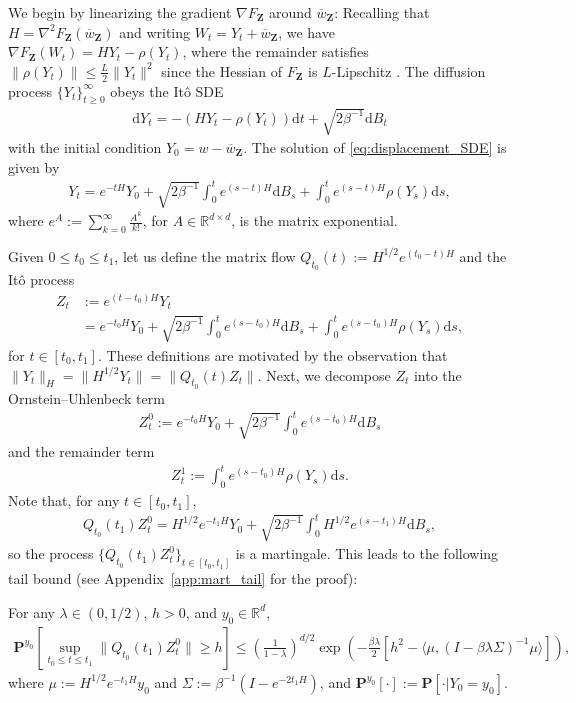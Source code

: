 \documentclass[final,12pt]{colt2018}
\numberwithin{equation}{section}
\numberwithin{equation}{section}
\def\PP{\mathbf{P}}
\def\Reals{\mathbb{R}}
\def\deq{:=}
\def\bd#1{\mathbf{#1}}
\def\bZ{\bd{Z}}
\def\barw{\overline{w}}
\def\d{{\mathrm d}}
\def\ave#1{\langle #1 \rangle}
\begin{document}
We begin by linearizing the gradient $\nabla F_\bZ$ around $\barw_\bZ$: Recalling that $H = \nabla^2 F_\bZ(\barw_\bZ)$ and writing $W_t = Y_t + \barw_\bZ$, we have $\nabla F_\bZ(W_t) = HY_t - \rho(Y_t)$, where the remainder satisfies $\|\rho(Y_t)\| \le \frac{L}{2}\|Y_t\|^2$ since the Hessian of $F_\bZ$ is $L$-Lipschitz \citep[Lemma~1.2.4]{nesterov2013introductory}.  The diffusion process $\{Y_t\}^\infty_{t \ge 0}$ obeys the It\^{o} SDE
    \begin{align}\label{eq:displacement_SDE}
    	\d Y_t = -(HY_t - \rho(Y_t))\d t + \sqrt{2\beta^{-1}}\d B_t
    \end{align}
    with the initial condition $Y_0 = w - \barw_\bZ$. The solution of \eqref{eq:displacement_SDE} is given by
    \begin{align*}
    	Y_t = e^{-tH}Y_0 + \sqrt{2\beta^{-1}}\int^t_0 e^{(s-t)H}\d B_s + \int^t_0 e^{(s-t)H}\rho(Y_s) \d s,
    \end{align*}
	where $e^{A} \deq \sum^\infty_{k=0} \frac{A^k}{k!}$, for $A \in \Reals^{d \times d}$, is the matrix exponential. 

Given  $0 \le t_0 \le t_1$, let us define the matrix flow $Q_{t_0}(t) \deq H^{1/2}e^{(t_0-t)H}$ and the It\^{o} process
		\begin{align*}
			Z_t &\deq e^{(t-t_0)H}Y_t \\
			&= e^{-t_0H}Y_0 + \sqrt{2\beta^{-1}}\int^t_0 e^{(s-t_0)H}\d B_s + \int^t_0 e^{(s-t_0)H}\rho(Y_s)\d s,
		\end{align*}
	for $t \in [t_0,t_1]$. These definitions are motivated by the observation that $\| Y_t \|_H = \| H^{1/2}Y_t \| = \|Q_{t_0}(t)Z_t \|$. Next, we decompose $Z_t$ into the Ornstein--Uhlenbeck term
	    \begin{align*}
	    	Z^0_t \deq e^{-t_0H}Y_0 + \sqrt{2\beta^{-1}}\int^t_0 e^{(s-t_0)H} \d B_s
	    \end{align*}
	    and the remainder term
	    \begin{align*}
	    	Z^1_t \deq \int^t_0 e^{(s-t_0)H}\rho(Y_s)\d s.
	    \end{align*}
Note that, for any $t \in [t_0,t_1]$,
\begin{align*}
	Q_{t_0}(t_1)Z^0_t = H^{1/2}e^{-t_1H}Y_0 + \sqrt{2\beta^{-1}}\int^t_0 H^{1/2}e^{(s-t_1)H}\d B_s,
\end{align*}
so the process $\{ Q_{t_0}(t_1)Z^0_t\}_{t \in [t_0,t_1]}$ is a martingale. This leads to the following tail bound (see Appendix~\ref{app:mart_tail} for the proof):

	\begin{lemma}\label{lm:mart_tail} For any $\lambda \in (0,1/2)$, $h > 0$, and $y_0 \in \Reals^d$,
		\begin{align}\label{eq:Z0_tail_bound}
			\PP^{y_0} \left[\sup_{t_0 \le t \le t_1} \|Q_{t_0}(t_1)Z^0_t \| \ge h \right] \le \left(\frac{1}{1-\lambda}\right)^{d/2}\exp\left(-\frac{\beta\lambda}{2}\left[h^2-\ave{\mu,(I-\beta\lambda \Sigma)^{-1}\mu}\right]\right),
		\end{align}
		where
	$\mu \deq H^{1/2}e^{-t_1H}y_0$ and $\Sigma \deq \beta^{-1}(I-e^{-2t_1H})$, and $\PP^{y_0}[\cdot] \deq \PP[\cdot|Y_0=y_0]$.
	\end{lemma}
	   
\end{document}

